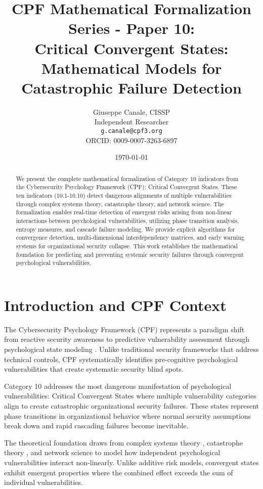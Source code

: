 \documentclass[11pt,a4paper]{article}
\title{CPF Mathematical Formalization Series - Paper 10:\\Critical Convergent States: Mathematical Models for Catastrophic Failure Detection}
\author{
    Giuseppe Canale, CISSP\\
    Independent Researcher\\
    \texttt{g.canale@cpf3.org}\\
    ORCID: 0009-0007-3263-6897
}
\date{\today}
\begin{document}
\maketitle

\begin{abstract}
We present the complete mathematical formalization of Category 10 indicators from the Cybersecurity Psychology Framework (CPF): Critical Convergent States. These ten indicators (10.1-10.10) detect dangerous alignments of multiple vulnerabilities through complex systems theory, catastrophe theory, and network science. The formalization enables real-time detection of emergent risks arising from non-linear interactions between psychological vulnerabilities, utilizing phase transition analysis, entropy measures, and cascade failure modeling. We provide explicit algorithms for convergence detection, multi-dimensional interdependency matrices, and early warning systems for organizational security collapse. This work establishes the mathematical foundation for predicting and preventing systemic security failures through convergent psychological vulnerabilities.
\end{abstract}

\section{Introduction and CPF Context}

The Cybersecurity Psychology Framework (CPF) represents a paradigm shift from reactive security awareness to predictive vulnerability assessment through psychological state modeling \cite{canale2024cpf}. Unlike traditional security frameworks that address technical controls, CPF systematically identifies pre-cognitive psychological vulnerabilities that create systematic security blind spots.

Category 10 addresses the most dangerous manifestation of psychological vulnerabilities: Critical Convergent States where multiple vulnerability categories align to create catastrophic organizational security failures. These states represent phase transitions in organizational behavior where normal security assumptions break down and rapid cascading failures become inevitable.

The theoretical foundation draws from complex systems theory \cite{holland1995}, catastrophe theory \cite{thom1975}, and network science \cite{barabasi2002} to model how independent psychological vulnerabilities interact non-linearly. Unlike additive risk models, convergent states exhibit emergent properties where the combined effect exceeds the sum of individual vulnerabilities.
\end{document}
